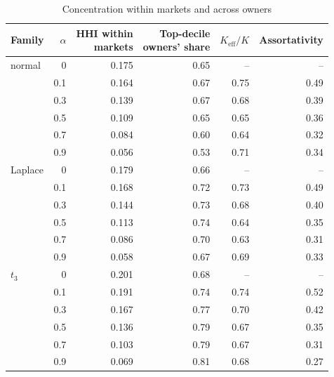 \begin{table}[htbp]
\centering
\caption{Concentration within markets and across owners}
\label{tab:a18_concentration}
\small
\begin{tabular}{lrrrrr}
\toprule
Family & $\alpha$ & \makecell[b]{HHI within\\{}markets} & \makecell[b]{Top-decile\\{}owners' share} & $K_{\text{eff}}/K$ & Assortativity \\
\midrule
normal & 0 & 0.175 & 0.65 & -- & -- \\
 & 0.1 & 0.164 & 0.67 & 0.75 & 0.49 \\
 & 0.3 & 0.139 & 0.67 & 0.68 & 0.39 \\
 & 0.5 & 0.109 & 0.65 & 0.65 & 0.36 \\
 & 0.7 & 0.084 & 0.60 & 0.64 & 0.32 \\
 & 0.9 & 0.056 & 0.53 & 0.71 & 0.34 \\
Laplace & 0 & 0.179 & 0.66 & -- & -- \\
 & 0.1 & 0.168 & 0.72 & 0.73 & 0.49 \\
 & 0.3 & 0.144 & 0.73 & 0.68 & 0.40 \\
 & 0.5 & 0.113 & 0.74 & 0.64 & 0.35 \\
 & 0.7 & 0.086 & 0.70 & 0.63 & 0.31 \\
 & 0.9 & 0.058 & 0.67 & 0.69 & 0.33 \\
$t_3$ & 0 & 0.201 & 0.68 & -- & -- \\
 & 0.1 & 0.191 & 0.74 & 0.74 & 0.52 \\
 & 0.3 & 0.167 & 0.77 & 0.70 & 0.42 \\
 & 0.5 & 0.136 & 0.79 & 0.67 & 0.35 \\
 & 0.7 & 0.103 & 0.79 & 0.67 & 0.31 \\
 & 0.9 & 0.069 & 0.81 & 0.68 & 0.27 \\
\bottomrule
\end{tabular}
\end{table}
